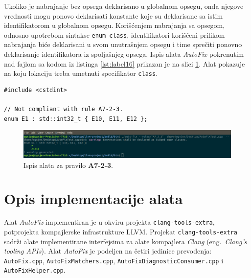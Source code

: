 \documentclass[12pt,oneside]{memoir}
\begin{document}
Ukoliko je nabrajanje bez opsega deklarisano u globalnom opsegu, onda njegove vrednosti mogu ponovo deklarisati konstante koje su deklarisane sa istim identifikatorom u globalnom opsegu. Kori\v{s}\'{c}enjem nabrajanja sa opsegom, odnosno upotrebom sintakse \texttt{enum class}, identifikatori kori\v{s}\'{c}eni prilikom
nabrajanja bi\'{c}e deklarisani u svom unutra\v{s}njem opsegu i time spre\v{c}iti ponovno deklarisanje identifikatora iz spolja\v{s}njeg opsega. 
Ispis alata \textit{AutoFix} pokrenutim nad fajlom sa kodom iz listinga \ref{lst:label16} prikazan je na slici \ref{fig:A7-2-3}. 
Alat pokazuje na koju lokaciju treba umetnuti specifikator \texttt{class}.
\\

\begin{lstlisting}[style=customc, caption={Primer koda koji nije napisan u skladu sa pravilom \textbf{A7-2-3}, odnosno ne koristi sintaksu \texttt{enum class}.}, label=lst:label16]
#include <cstdint>

// Not compliant with rule A7-2-3.
enum E1 : std::int32_t { E10, E11, E12 };

\end{lstlisting}


\begin{figure}[!h]
\begin{center}
\includegraphics[scale=0.3]{A7_2_3.png}
\end{center}
\caption{Ispis alata za pravilo \textbf{A7-2-3}.}
\label{fig:A7-2-3}
\end{figure}

\section{Opis implementacije alata}

Alat \textit{AutoFix} implementiran je u okviru projekta \texttt{clang-tools-extra}, potprojekta kompajlerske infrastrukture LLVM. Projekat \texttt{clang-tools-extra} sadr\v{z}i alate implementirane interfejsima za alate kompajlera \textit{Clang} (eng.~\textit{Clang’s tooling APIs}).
Alat \textit{AutoFix} je podeljen na \v{c}etiri jedinice prevođenja: \texttt{AutoFix.cpp}, \texttt{AutoFix\-Matchers.cpp}, \texttt{AutoFixDiagnosticConsumer.cpp} i \texttt{AutoFixHelper.cpp}.
\end{document}
